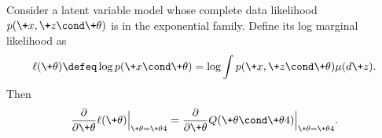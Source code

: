 \documentclass{article} %
\newcommand{\param}{\+\theta}
\begin{document}
\begin{proposition}
Consider a latent variable model whose complete data likelihood  $p(\+x, \+z \cond \param)$ is in the exponential family.  Define its log marginal likelihood as
% 
\begin{align}
\ell(\param) \defeq \log p(\+x \cond \param) = \log \int p(\+x,\+z \cond \param) \mu(d\+z).	
\label{eqn:log_marginal_likelihood_definition}
\end{align}
%
Then 
%
\begin{align}
\frac{\partial }{\partial \param} \ell(\param) \Bigr|_{\param = \param^^t} = \frac{\partial }{\partial \param} Q(\param \cond \param^^t) \Bigr|_{\param = \param^^t}.
\end{align}
%
\label{prop:Q_function_and_log_marginal_likelihood_have_the_same_gradients_when_evaluated_at_the_current_param_value}
\end{proposition}
\end{document}
